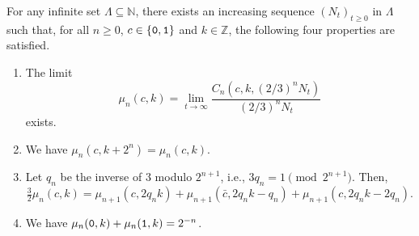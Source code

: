 \documentclass[12pt,reqno]{article}
\newcommand{\cA}{\{{\tt 0},{\tt 1}\}}
\newcommand{\N}{\mathbb{N}}
\newcommand{\Z}{\mathbb{Z}}
\begin{document}
\begin{lemma}
\label{lem:main_compacity_argument}
For any infinite set $\Lambda \subseteq \N$,  there exists an increasing sequence $(N_t)_{t \ge 0}$ in $\Lambda$ such that, for all $n \ge 0$, $c \in \cA$ and $k \in \Z$, the following four properties are satisfied.
\begin{enumerate}
    \item The limit
    \[  \mu_n(c,k) = 
      \lim_{t \to \infty}
      \frac{C_{n}\left(c,k, \left(2/3\right)^{n} N_t \right)}{\left(2/3\right)^{n} N_t}
    \]
    exists.
  \item We have $\mu_n(c,k+2^n) = \mu_n(c,k)$.
    \item Let $q_n$ be the inverse of $3$ modulo $2^{n+1}$,  i.e.,  $3q_n = 1 \pmod{2^{n+1}}$.
    Then,
    \begin{equation}\label{eq:des_rec}
    \tfrac{3}{2} \mu_n(c,k) = 
    \mu_{n+1}(c, 2q_nk) + 
    \mu_{n+1}(\bar{c}, 2q_nk-q_n) +
    \mu_{n+1}(c, 2q_nk-2q_n).
    \end{equation}
    \item  We have $\mu_n({\tt 0},k) + \mu_n({\tt 1},k) = 2^{-n}$.  
\end{enumerate}
\end{lemma}
\end{document}
